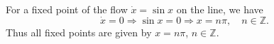 
For a fixed point of the flow $\dot{x} = \sin{x}$ on the line, we have 
\[
    \dot{x} = 0 \Rightarrow \sin{x} = 0 \Rightarrow x = n\pi, \quad n \in \mathbb{Z}.
\]
Thus all fixed points are given by $x = n\pi$, $n \in \mathbb{Z}$.

